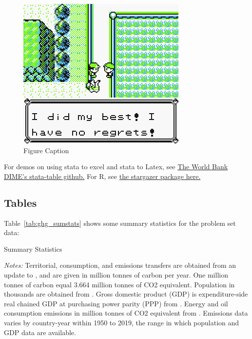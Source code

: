 \begin{figure}[H]
	\centering %
	\includegraphics[width=.6\linewidth]{figures/did-best-no-regrets.png}
	\caption{Figure Caption} %
	\label{fig:fig3}
\end{figure}


For demos on using stata to excel and stata to Latex, see \href{https://github.com/worldbank/stata-tables}{The World Bank DIME's stata-table github.} For R, see \href{https://www.jakeruss.com/cheatsheets/stargazer/#the-default-summary-statistics-table}{the stargazer package here.}


\subsection{Tables}

Table~\ref{tab:ghg_sumstats} shows some summary statistics for the problem set data:

\begin{table}[H]
\centering
\caption{Summary Statistics}
\footnotesize
{
\def\sym#1{\ifmmode^{#1}\else\(^{#1}\)\fi}
\begin{threeparttable}



  \begin{tablenotes}
    \item \emph{Notes:} Territorial, consumption, and emissions transfers are obtained from an update to \citet{petersSynthesisCarbonInternational2012}, and are given in million tonnes of carbon per year. One million tonnes of carbon equal 3.664 million tonnes of CO2 equivalent. Population in thousands are obtained from \citet{undesaWorldPopulationProspects2022}. Gross domestic product (GDP) is expenditure-side real chained GDP at purchasing power parity (PPP) from \citet{feenstraNextGenerationPenn2015}. Energy and oil consumption emissions in million tonnes of CO2 equivalent from \citet{ieaGreenhouseGasEmissions2023}. Emissions data varies by country-year within 1950 to 2019, the range in which population and GDP data are available.
  \end{tablenotes}

\end{threeparttable}
}
\label{tab:ghg_sumstats}
\end{table}

